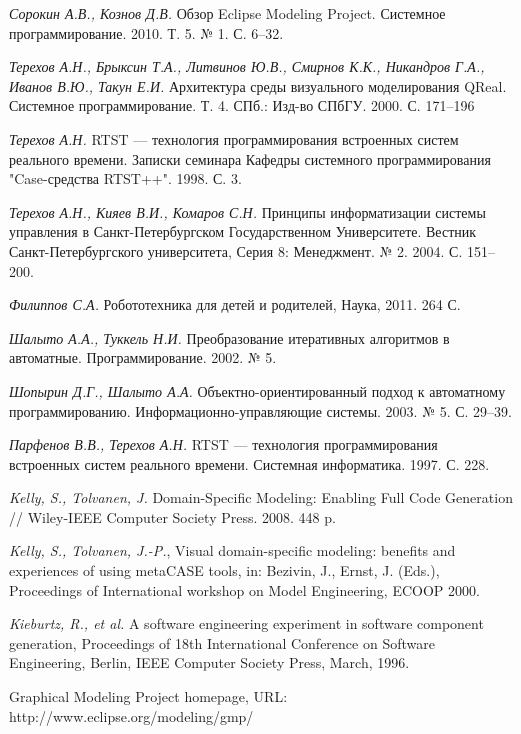 \documentclass[a4paper]{article}
\begin{document}
\begin{thebibliography}{9001}
   \emph{Сорокин А.В., Кознов Д.В.} Обзор Eclipse Modeling Project. Системное программирование. 2010. Т. 5. № 1. С. 6--32. 

   \emph{Терехов А.Н., Брыксин Т.А., Литвинов Ю.В., Смирнов К.К., Никандров Г.А., Иванов В.Ю., Такун Е.И.} Архитектура среды визуального моделирования QReal. Системное программирование. Т. 4.  СПб.: Изд-во СПбГУ. 2000. С. 171--196

   \emph{Терехов А.Н.} RTST --- технология программирования встроенных систем реального времени. Записки семинара Кафедры системного программирования "Case-средства RTST++". 1998. С. 3.

   \emph{Терехов А.Н., Кияев В.И., Комаров С.Н.} Принципы информатизации системы управления в Санкт-Петербургском Государственном Университете. Вестник Санкт-Петербургского университета, Серия 8: Менеджмент. № 2. 2004. С. 151--200.

   \emph{Филиппов С.А.} Робототехника для детей и родителей, Наука, 2011. 264 С.

   \emph{Шалыто А.А., Туккель Н.И.} Преобразование итеративных алгоритмов в автоматные. Программирование. 2002. № 5.

   \emph{Шопырин Д.Г., Шалыто А.А.} Объектно-ориентированный подход к автоматному программированию. Информационно-управляющие системы. 2003. № 5. С. 29--39.

   \emph{Парфенов В.В., Терехов А.Н.} RTST --- технология программирования встроенных систем реального времени. Системная информатика. 1997. С. 228.

   \emph{Kelly, S., Tolvanen, J.} Domain-Specific Modeling: Enabling Full Code Generation // Wiley-IEEE Computer Society Press. 2008. 448 p.

   \emph{Kelly, S., Tolvanen, J.-P.}, Visual domain-specific modeling: benefits and experiences of using metaCASE tools, in: Bezivin, J., Ernst, J. (Eds.), Proceedings of International workshop on Model Engineering, ECOOP 2000.

   \emph{Kieburtz, R., et al.} A software engineering experiment in software component generation, Proceedings of 18th International Conference on Software Engineering, Berlin, IEEE Computer Society Press, March, 1996.

   Graphical Modeling Project homepage, URL: http://www.eclipse.org/modeling/gmp/ 


\end{thebibliography}
\end{document}
